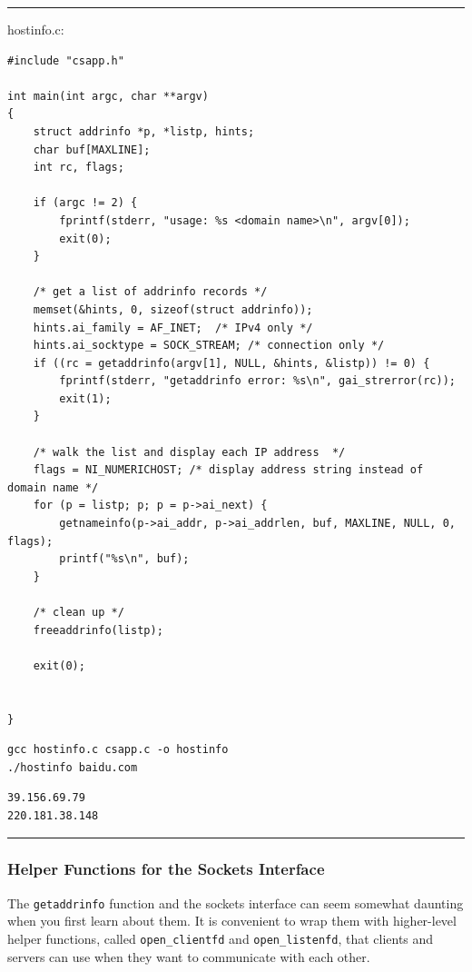 \documentclass[11pt]{article}
\begin{document}
\begin{enumerate}
\noindent\rule{\textwidth}{0.5pt}
hostinfo.c:\\

\begin{verbatim}
#include "csapp.h"

int main(int argc, char **argv)
{
    struct addrinfo *p, *listp, hints;
    char buf[MAXLINE];
    int rc, flags;

    if (argc != 2) {
        fprintf(stderr, "usage: %s <domain name>\n", argv[0]);
        exit(0);
    }

    /* get a list of addrinfo records */
    memset(&hints, 0, sizeof(struct addrinfo));
    hints.ai_family = AF_INET;	/* IPv4 only */
    hints.ai_socktype = SOCK_STREAM; /* connection only */
    if ((rc = getaddrinfo(argv[1], NULL, &hints, &listp)) != 0) {
        fprintf(stderr, "getaddrinfo error: %s\n", gai_strerror(rc));
        exit(1);
    }

    /* walk the list and display each IP address  */
    flags = NI_NUMERICHOST;	/* display address string instead of domain name */
    for (p = listp; p; p = p->ai_next) {
        getnameinfo(p->ai_addr, p->ai_addrlen, buf, MAXLINE, NULL, 0, flags);
        printf("%s\n", buf);
    }

    /* clean up */
    freeaddrinfo(listp);

    exit(0);


}

\end{verbatim}

\begin{verbatim}
gcc hostinfo.c csapp.c -o hostinfo
./hostinfo baidu.com
\end{verbatim}

\begin{verbatim}
39.156.69.79
220.181.38.148
\end{verbatim}

\noindent\rule{\textwidth}{0.5pt}
\end{enumerate}

\subsubsection{Helper Functions for the Sockets Interface}
\label{sec:org9c6038c}
The \texttt{getaddrinfo} function and the sockets interface can seem somewhat daunting when you first learn about them. It is convenient to wrap them with higher-level helper functions, called \texttt{open\_clientfd} and \texttt{open\_listenfd}, that clients and servers can use when they want to communicate with each other.\\
\end{document}
